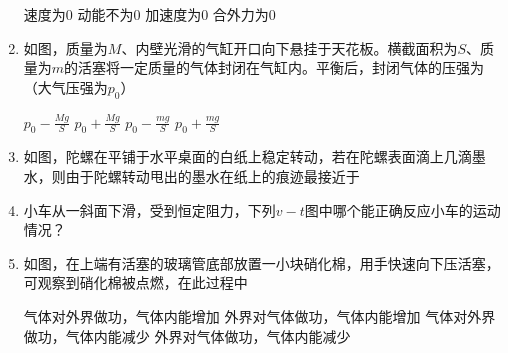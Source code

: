 \begin{enumerate}
\fourchoices
{速度为$ 0 $}
{动能不为$ 0 $}
{加速度为$ 0 $}
{合外力为$ 0 $}



\item
如图，质量为$ M $、内壁光滑的气缸开口向下悬挂于天花板。横截面积为$ S $、质量为$ m $的活塞将一定质量的气体封闭在气缸内。平衡后，封闭气体的压强为（大气压强为$ p_{0} $）  
\begin{figure}[h!]
	\centering
	
\end{figure}


\fourchoices
{$p_{0}-\frac{M g}{S}$}
{$p_{0}+\frac{M g}{S}$}
{$p_{0}-\frac{m g}{S}$}
{$p_{0}+\frac{m g}{S}$}



\item
如图，陀螺在平铺于水平桌面的白纸上稳定转动，若在陀螺表面滴上几滴墨水，则由于陀螺转动甩出的墨水在纸上的痕迹最接近于  
\begin{figure}[h!]
	\centering
	
\end{figure}

\pfourchoices
{}
{}
{}
{}






\item
小车从一斜面下滑，受到恒定阻力，下列$ v-t $图中哪个能正确反应小车的运动情况？  

\pfourchoices
{}
{}
{}
{}




\item
如图，在上端有活塞的玻璃管底部放置一小块硝化棉，用手快速向下压活塞，可观察到硝化棉被点燃，在此过程中  
\begin{figure}[h!]
	\centering
	
\end{figure}

\fourchoices
{气体对外界做功，气体内能增加}
{外界对气体做功，气体内能增加}
{气体对外界做功，气体内能减少}
{外界对气体做功，气体内能减少}





\end{enumerate}
